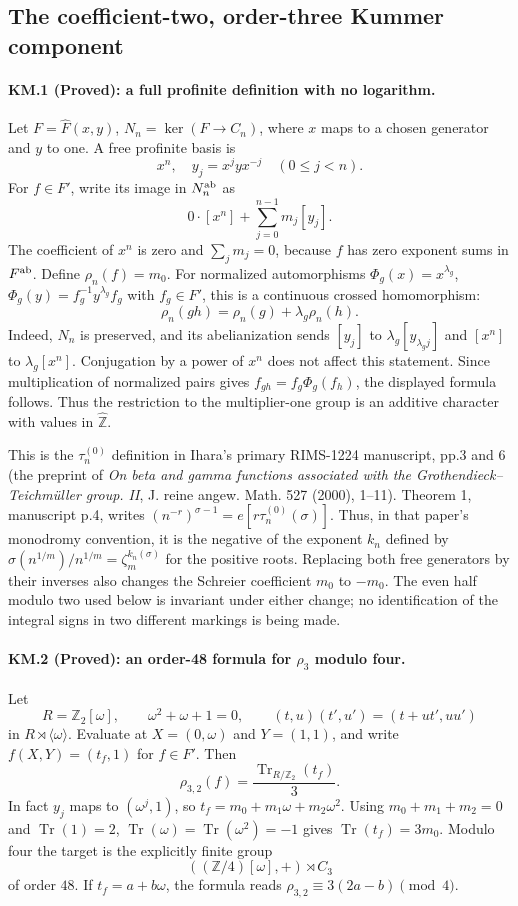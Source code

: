 \subsection*{The coefficient-two, order-three Kummer component}

\paragraph{KM.1 (Proved): a full profinite definition with no logarithm.}
Let $F=\widehat F(x,y)$, $N_n=\ker(F\to C_n)$, where $x$ maps
to a chosen generator and $y$ to one.  A free profinite basis is
\[
 x^n,\quad y_j=x^jyx^{-j}\quad(0\leq j<n).
\]
For $f\in F'$, write its image in $N_n^{\rm ab}$ as
\[
 0\cdot[x^n]+\sum_{j=0}^{n-1}m_j[y_j].
\]
The coefficient of $x^n$ is zero and $\sum_jm_j=0$, because
$f$ has zero exponent sums in $F^{\rm ab}$.
Define $\rho_n(f)=m_0$.
For normalized automorphisms $\Phi_g(x)=x^{\lambda_g}$,
$\Phi_g(y)=f_g^{-1}y^{\lambda_g}f_g$ with $f_g\in F'$, this is
a continuous crossed homomorphism:
\[
 \rho_n(gh)=\rho_n(g)+\lambda_g\rho_n(h).
\]
Indeed, $N_n$ is preserved, and its abelianization sends
$[y_j]$ to $\lambda_g[y_{\lambda_gj}]$ and $[x^n]$ to
$\lambda_g[x^n]$.  Conjugation by a power of $x^n$ does not
affect this statement.  Since multiplication of normalized pairs
gives $f_{gh}=f_g\Phi_g(f_h)$, the displayed formula follows.
Thus the restriction to the multiplier-one group is an additive
character with values in $\widehat{\mathbb Z}$.

This is the $\tau_n^{(0)}$ definition in Ihara's primary
RIMS-1224 manuscript, pp.3 and 6 (the preprint of
\emph{On beta and gamma functions associated with the
Grothendieck--Teichm\"uller group. II}, J. reine angew. Math.
527 (2000), 1--11). Theorem 1, manuscript p.4, writes
$(n^{-r})^{\sigma-1}=e[r\tau_n^{(0)}(\sigma)]$.
Thus, in that paper's monodromy convention, it is the negative
of the exponent $k_n$ defined by
$\sigma(n^{1/m})/n^{1/m}=\zeta_m^{k_n(\sigma)}$ for the positive roots.
Replacing both free generators by their inverses also changes the
Schreier coefficient $m_0$ to $-m_0$.
The even half modulo two used below is invariant under either change;
no identification of the integral signs in two different markings
is being made.

\paragraph{KM.2 (Proved): an order-48 formula for $\rho_3$ modulo four.}
Let
\[
 R=\mathbb Z_2[\omega],\qquad \omega^2+\omega+1=0,
 \qquad (t,u)(t',u')=(t+ut',uu')
\]
in $R\rtimes\langle\omega\rangle$.  Evaluate at
$X=(0,\omega)$ and $Y=(1,1)$, and write
$f(X,Y)=(t_f,1)$ for $f\in F'$.  Then
\[
 \rho_{3,2}(f)=\frac{\operatorname{Tr}_{R/\mathbb Z_2}(t_f)}3.
 \tag{KM.2}
\]
In fact $y_j$ maps to $(\omega^j,1)$, so
$t_f=m_0+m_1\omega+m_2\omega^2$.
Using $m_0+m_1+m_2=0$ and
$\operatorname{Tr}(1)=2$, $\operatorname{Tr}(\omega)
=\operatorname{Tr}(\omega^2)=-1$ gives
$\operatorname{Tr}(t_f)=3m_0$.
Modulo four the target is the explicitly finite group
\[
 ((\mathbb Z/4)[\omega],+)\rtimes C_3
\]
of order $48$.  If $t_f=a+b\omega$, the formula reads
$\rho_{3,2}\equiv3(2a-b)\pmod4$.

